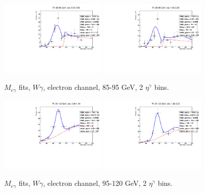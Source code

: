 \begin{figure}[htb]
  \begin{center}
   \includegraphics[width=0.45\textwidth]{../figs/figs_v11/ELECTRON_WGamma/EtoGammaFits/sa_hZmass_h_Data_EtoGamma_Enr_BARREL_pt85to95_ieta0.pdf}
   \includegraphics[width=0.45\textwidth]{../figs/figs_v11/ELECTRON_WGamma/EtoGammaFits/sa_hZmass_h_Data_EtoGamma_Enr_ENDCAP_pt85to95_ieta0.pdf}\\
  \label{fig:etogFits_85to95}
  \caption{$M_{e\gamma}$ fits, $W\gamma$, electron channel, 85-95 GeV, 2 $\eta^{\gamma}$ bins.}
  \end{center}
\end{figure}

\begin{figure}[htb]
  \begin{center}
   \includegraphics[width=0.45\textwidth]{../figs/figs_v11/ELECTRON_WGamma/EtoGammaFits/sa_hZmass_h_Data_EtoGamma_Enr_BARREL_pt95to120_ieta0.pdf}
   \includegraphics[width=0.45\textwidth]{../figs/figs_v11/ELECTRON_WGamma/EtoGammaFits/sa_hZmass_h_Data_EtoGamma_Enr_ENDCAP_pt95to120_ieta0.pdf}\\
  \label{fig:etogFits_95to120}
  \caption{$M_{e\gamma}$ fits, $W\gamma$, electron channel, 95-120 GeV, 2 $\eta^{\gamma}$ bins.}
  \end{center}
\end{figure}

